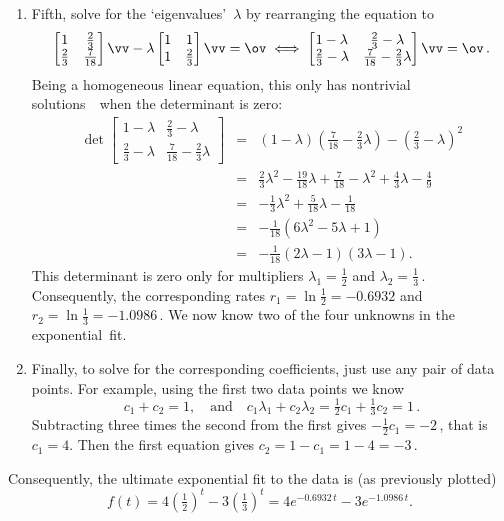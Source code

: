 \begin{example}
\begin{solution}
\begin{enumerate}
\item \label{eg:2expfite}
Fifth, solve for the `eigenvalues'~\(\lambda\) by rearranging the equation to
\begin{equation*}
\begin{bmatrix} 1&\tfrac23\\\tfrac23&\frac7{18} \end{bmatrix}\vv-\lambda\begin{bmatrix} 1&1\\1&\tfrac23 \end{bmatrix}\vv=\ov
\iff
\begin{bmatrix} 1-\lambda&\tfrac23-\lambda\\\tfrac23-\lambda&\frac7{18}-\tfrac23\lambda\end{bmatrix}\vv=\ov\,.
\end{equation*}
Being a homogeneous linear equation, this only has nontrivial solutions~\vv\ when the determinant is zero:
\begin{eqnarray*}
\det\begin{bmatrix} 1-\lambda&\tfrac23-\lambda\\\tfrac23-\lambda&\frac7{18}-\tfrac23\lambda\end{bmatrix}
&=&(1-\lambda)(\tfrac7{18}-\tfrac23\lambda)-(\tfrac23-\lambda)^2
\\&=&\tfrac23\lambda^2-\tfrac{19}{18}\lambda+\tfrac7{18}
-\lambda^2+\tfrac43\lambda-\tfrac49
\\&=&-\tfrac13\lambda^2+\tfrac5{18}\lambda-\tfrac1{18}
\\&=&-\tfrac1{18}(6\lambda^2-5\lambda+1)
\\&=&-\tfrac1{18}(2\lambda-1)(3\lambda-1).
\end{eqnarray*}
This determinant is zero only for multipliers \(\lambda_1=\tfrac12\) and \(\lambda_2=\tfrac13\)\,. 
Consequently, the corresponding rates \(r_1=\ln\tfrac12=-0.6932\) and \(r_2=\ln\tfrac13=-1.0986\)\,.
We now know two of the four unknowns in the exponential~fit.

\item \label{eg:2expfitf}
Finally, to solve for the corresponding coefficients, just use any pair of data points.
For example, using the first two data points we know
\begin{equation*}
c_1+c_2=1,\quad\text{and}\quad
c_1\lambda_1+c_2\lambda_2=\tfrac12c_1+\tfrac13c_2=1\,.
\end{equation*}
Subtracting three times the second from the first gives \(-\tfrac12c_1=-2\)\,, that is \(c_1=4\).
Then the first equation gives \(c_2=1-c_1=1-4=-3\)\,.
\end{enumerate}
Consequently, the ultimate exponential fit to the data is (as previously plotted)
\begin{equation*}
f(t)=4(\tfrac12)^t-3(\tfrac13)^t
=4e^{-0.6932\,t}-3e^{-1.0986\,t}.
\end{equation*}
\end{solution}
\end{example}



